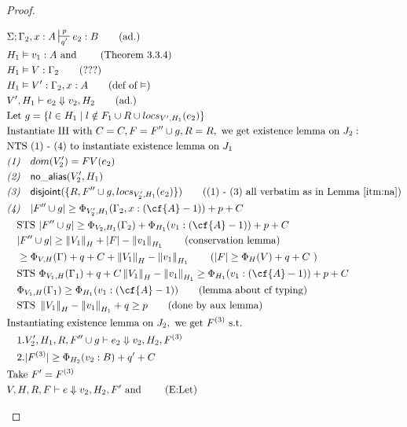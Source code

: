 \documentclass[sigconf]{acmart}
\newcommand{\na}[1]{\mathsf{no\_alias}(#1)}
\newcommand{\dist}[1]{\mathsf{disjoint}(#1)}
\newcommand{\ssize}[2]{\left\Vert #2 \right\Vert_{#1}}
\theoremstyle{definition}
\begin{document}
\begin{proof}
\begin{description}
\begin{align*}
  &\Sigma; \Gamma_2, x : A \sststile{q'}{p} e_2 : B \tag{ad.}\\
  &H_1 \vDash v_1 : A \text{ and } \tag{Theorem 3.3.4}\\ 
  &H_1 \vDash V : \Gamma_2 \tag{???}\\
  &H_1 \vDash V' : \Gamma_2, x : A \tag{def of $\vDash$}\\
  &V',H_1 \vdash e_2 \Downarrow v_2,H_2 \tag{ad.}\\
  &\text{Let } g = \{l \in H_1 \mid l \notin F_1 \cup R \cup locs_{V',H_1}(e_2)\}\\ 
  &\text{Instantiate IH with } C = C, F = F'' \cup g, R = R, \text{ we get existence lemma on  } J_2:\\
  &\text{NTS (1) - (4) to instantiate existence lemma on } J_1\\
  &\emph{(1)} \quad dom(V_2') = FV(e_2)\\
  &\emph{(2)} \quad \na{V_2',H_1} \\
  &\emph{(3)} \quad \dist{\{R,F'' \cup g,locs_{V_2',H_1}(e_2)\}} \tag{(1) - (3) all verbatim as in Lemma $\ref{itm:na}$}\\
  &\emph{(4)} \quad |F'' \cup g| \ge \Phi_{V_2',H_1}(\Gamma_2,x: (\cf{A} - 1)) + p + C\\
  &\quad \text{STS } |F'' \cup g| \ge \Phi_{V_2,H_1}(\Gamma_2) + \Phi_{H_1}(v_1 : (\cf{A} - 1)) + p + C\\
  &\quad |F'' \cup g| \ge \ssize{H}{V_1} + |F| - \ssize{H_1}{v_1} \tag{conservation lemma}\\
  &\quad \ge \Phi_{V,H}(\Gamma) + q + C + \ssize{H}{V_1} - \ssize{H_1}{v_1} 
    \tag{$|F| \ge \Phi_{H}(V) + q + C$ }\\
  &\quad \text{STS } \Phi_{V_1,H}(\Gamma_1) + q + C \ssize{H}{V_1} - \ssize{H_1}{v_1} \ge \Phi_{H_1}(v_1 : (\cf{A} - 1)) + p + C\\
  &\quad \Phi_{V_1,H}(\Gamma_1) \ge \Phi_{H_1}(v_1 : (\cf{A} - 1)) \tag{lemma about cf typing}\\
  &\quad \text{STS } \ssize{H}{V_1} - \ssize{H_1}{v_1} + q \ge p \tag{done by aux lemma}\\
  &\text{Instantiating existence lemma on } J_2, \text{ we get } F^{(3)} \text{ s.t. }\\
  &\quad 1. V_2',H_1,R, F'' \cup g \vdash e_2 \Downarrow v_2,H_2,F^{(3)} \\
  &\quad 2. |F^{(3)}| \ge \Phi_{H_2}(v_2:B) + q' + C\\
  &\text{Take } F' = F^{(3)}\\
  &V,H,R,F \vdash e \Downarrow v_2, H_2,F' \text{ and } \tag{E:Let}\\ 

\end{align*}
\end{description}
\end{proof}
\end{document}
